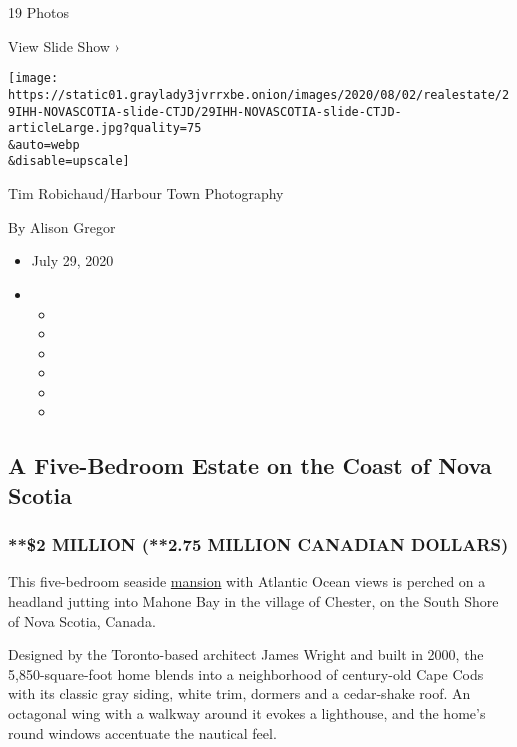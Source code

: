 19 Photos

View Slide Show ›

\texttt{[image: https://static01.graylady3jvrrxbe.onion/images/2020/08/02/realestate/29IHH-NOVASCOTIA-slide-CTJD/29IHH-NOVASCOTIA-slide-CTJD-articleLarge.jpg?quality=75\\\&auto=webp\\\&disable=upscale]}

Tim Robichaud/Harbour Town Photography

By Alison Gregor

\begin{itemize}
\item
  July 29, 2020
\item
  \begin{itemize}
  \item
  \item
  \item
  \item
  \item
  \item
  \end{itemize}
\end{itemize}

\hypertarget{a-five-bedroom-estate-on-the-coast-of-nova-scotia}{%
\subsection{A Five-Bedroom Estate on the Coast of Nova
Scotia}\label{a-five-bedroom-estate-on-the-coast-of-nova-scotia}}

\hypertarget{2-million-275-million-canadian-dollars}{%
\subsubsection{**\$2 MILLION (**2.75 MILLION CANADIAN
DOLLARS)}\label{2-million-275-million-canadian-dollars}}

This five-bedroom seaside
\href{https://novascotia.evrealestate.com/ListingDetails/26-Fredas-Point-Extension-Chester-NS-B0J-1J0/201909280}{mansion}
with Atlantic Ocean views is perched on a headland jutting into Mahone
Bay in the village of Chester, on the South Shore of Nova Scotia,
Canada.

Designed by the Toronto-based architect James Wright and built in 2000,
the 5,850-square-foot home blends into a neighborhood of century-old
Cape Cods with its classic gray siding, white trim, dormers and a
cedar-shake roof. An octagonal wing with a walkway around it evokes a
lighthouse, and the home's round windows accentuate the nautical feel.

